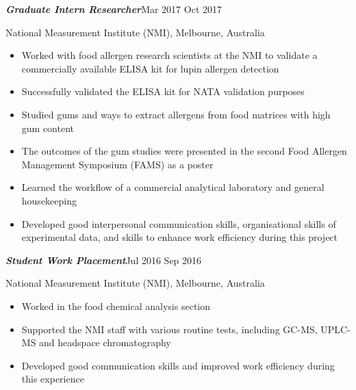 \documentclass[11pt, a4paper, twoside]{article}
\begin{document}
\begin{adjustwidth}{0.2\textwidth}{}
\begin{itemize}
    \end{itemize}\par\vspace{0.7ex}
    \textbf{\large\itshape Graduate Intern Researcher}\hfill Mar 2017 \textendash{} Oct 2017\par\vspace{-0.4ex}
    {\small National Measurement Institute (NMI), Melbourne, Australia}\par\vspace{-0.8ex}
    \begin{itemize}
        \setlength\itemsep{-0.5ex}
        \item Worked with food allergen research scientists at the NMI to validate a commercially available ELISA kit for lupin allergen detection
        \item Successfully validated the ELISA kit for NATA validation purposes
        \item Studied gums and ways to extract allergens from food matrices with high gum content
        \item The outcomes of the gum studies were presented in the second Food Allergen Management Symposium (FAMS) as a poster
        \item Learned the workflow of a commercial analytical laboratory and general housekeeping
        \item Developed good interpersonal communication skills, organisational skills of experimental data, and skills to enhance work efficiency during this project
    \end{itemize}\par\vspace{0.7ex}
    \textbf{\large\itshape Student Work Placement}\hfill Jul 2016 \textendash{} Sep 2016\par\vspace{-0.4ex}
    {\small National Measurement Institute (NMI), Melbourne, Australia}\par\vspace{-0.8ex}
    \begin{itemize}
        \setlength\itemsep{-0.5ex}
        \item Worked in the food chemical analysis section
        \item Supported the NMI staff with various routine tests, including GC-MS, UPLC-MS and headspace chromatography
        \item Developed good communication skills and improved work efficiency during this experience
    \end{itemize}
\end{adjustwidth}\par
\end{document}
